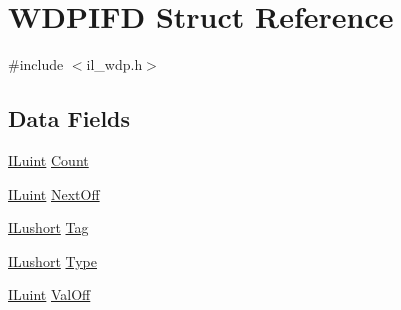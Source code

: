 \hypertarget{struct_w_d_p_i_f_d}{\section{W\-D\-P\-I\-F\-D Struct Reference}
\label{struct_w_d_p_i_f_d}
}


{\ttfamily \#include $<$il\-\_\-wdp.\-h$>$}

\subsection*{Data Fields}
\begin{DoxyCompactItemize}
\item 
\hyperlink{il_8h_ac6508d0e9c19e32f32e00d54b5b8cf30}{I\-Luint} \hyperlink{struct_w_d_p_i_f_d_ae47966249258ef1f08430444cdca8892}{Count}
\item 
\hyperlink{il_8h_ac6508d0e9c19e32f32e00d54b5b8cf30}{I\-Luint} \hyperlink{struct_w_d_p_i_f_d_ac0a76550a70ae0506e227006e39733f9}{Next\-Off}
\item 
\hyperlink{il_8h_af6287b43748354a7c4864da43ae56962}{I\-Lushort} \hyperlink{struct_w_d_p_i_f_d_a7a0d1fd108b56c4d85eb221c709db9a8}{Tag}
\item 
\hyperlink{il_8h_af6287b43748354a7c4864da43ae56962}{I\-Lushort} \hyperlink{struct_w_d_p_i_f_d_af4653b5eec325c51981a48f69efdcd25}{Type}
\item 
\hyperlink{il_8h_ac6508d0e9c19e32f32e00d54b5b8cf30}{I\-Luint} \hyperlink{struct_w_d_p_i_f_d_ab8657de8ff64d504446fe29515ca73b0}{Val\-Off}
\end{DoxyCompactItemize}


